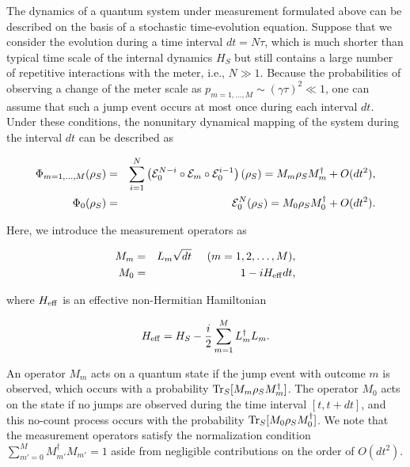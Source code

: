 \documentclass{tADP2e}
\theoremstyle{plain}
\newcommand{\eqn}[1]{
\begin{eqnarray}
	#1
\end{eqnarray}
}
\theoremstyle{plain}
\theoremstyle{definition}
\begin{document}
\vspace{3pt}
\noindent
The dynamics of a quantum system under measurement formulated above can be described on the basis of a stochastic time-evolution equation. Suppose that we consider the evolution during a time interval $dt=N\tau$, which is much shorter than typical time scale of the internal dynamics $H_S$ but still contains a large number of repetitive interactions with the meter, i.e., $N\gg 1$. Because the probabilities of observing a change of the meter scale as $p_{m=1,\ldots,M}\sim(\gamma\tau)^2\ll 1$, one can assume that such a jump event occurs at most once during each interval $dt$. Under these conditions, the nonunitary dynamical mapping of the system during the interval $dt$ can be described as 
\eqn{
\Phi_{m=1,\ldots,M}( {\rho}_{S}) & =&\sum_{i=1}^{N}\left({\cal E}_{0}^{N-i}\circ{\cal E}_{m}\circ{\cal E}_{0}^{i-1}\right)( {\rho}_{S})= {M}_{m} {\rho}_{S} {M}_{m}^{\dagger}+O(dt^{2}),\\
\Phi_{0}( {\rho}_{S}) & =&{\cal E}_{0}^{N}( {\rho}_{S})=M_0 {\rho}_{S}M_0^{\dagger}+O(dt^{2}).
}
Here, we introduce the measurement operators as 
\eqn{
 {M}_{m}&=& {L}_{m}\sqrt{dt}\;\;\;\;\;(m=1,2,\ldots,M),\label{conmeass}\\
 {M}_{0}&=&1-i {H}_{{\rm eff}}dt,\label{conmeas}
}
where $H_{\rm eff}$ is an effective non-Hermitian Hamiltonian 
\eqn{\label{qoptnh}
 {H}_{{\rm eff}}= {H}_{S}-\frac{i}{2}\sum_{m=1}^{M} {L}_{m}^{\dagger} {L}_{m}.
}
An operator $ {M}_{m}$ acts on a quantum state if the jump event with outcome $m$ is observed, which occurs with a probability ${\rm Tr}_S[M_m\rho_S M_m^\dagger]$. 
The operator $ {M}_{0}$ acts on the state if no jumps are observed during the time interval $[t,t+dt]$, and this no-count process occurs with the probability ${\rm Tr}_S[M_0\rho_S M_0^\dagger]$. 
We note that the measurement operators satisfy the normalization condition $\sum_{m'=0}^{M} {M}_{m'}^{\dagger} {M}_{m'}=1$ aside from negligible contributions on the order of $O(dt^2)$.
\end{document}
